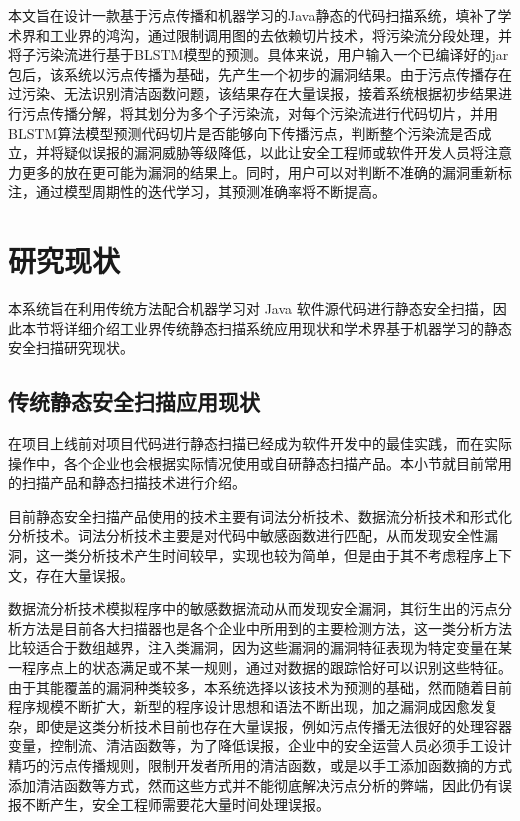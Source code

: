 本文旨在设计一款基于污点传播和机器学习的Java静态的代码扫描系统，填补了学术界和工业界的鸿沟，通过限制调用图的去依赖切片技术，将污染流分段处理，并将子污染流进行基于BLSTM模型的预测。具体来说，用户输入一个已编译好的jar包后，该系统以污点传播为基础，先产生一个初步的漏洞结果。由于污点传播存在过污染、无法识别清洁函数问题，该结果存在大量误报，接着系统根据初步结果进行污点传播分解，将其划分为多个子污染流，对每个污染流进行代码切片，并用BLSTM算法模型预测代码切片是否能够向下传播污点，判断整个污染流是否成立，并将疑似误报的漏洞威胁等级降低，以此让安全工程师或软件开发人员将注意力更多的放在更可能为漏洞的结果上。同时，用户可以对判断不准确的漏洞重新标注，通过模型周期性的迭代学习，其预测准确率将不断提高。

\section{研究现状}
本系统旨在利用传统方法配合机器学习对 Java 软件源代码进行静态安全扫描，因此本节将详细介绍工业界传统静态扫描系统应用现状和学术界基于机器学习的静态安全扫描研究现状。\\

\subsection{传统静态安全扫描应用现状}

在项目上线前对项目代码进行静态扫描已经成为软件开发中的最佳实践，而在实际操作中，各个企业也会根据实际情况使用或自研静态扫描产品。本小节就目前常用的扫描产品和静态扫描技术进行介绍。

目前静态安全扫描产品使用的技术主要有词法分析技术、数据流分析技术和形式化分析技术。词法分析技术主要是对代码中敏感函数进行匹配，从而发现安全性漏洞，这一类分析技术产生时间较早，实现也较为简单，但是由于其不考虑程序上下文，存在大量误报。

数据流分析技术模拟程序中的敏感数据流动从而发现安全漏洞，其衍生出的污点分析方法是目前各大扫描器也是各个企业中所用到的主要检测方法，这一类分析方法比较适合于数组越界，注入类漏洞，因为这些漏洞的漏洞特征表现为特定变量在某一程序点上的状态满足或不某一规则，通过对数据的跟踪恰好可以识别这些特征。由于其能覆盖的漏洞种类较多，本系统选择以该技术为预测的基础，然而随着目前程序规模不断扩大，新型的程序设计思想和语法不断出现，加之漏洞成因愈发复杂，即使是这类分析技术目前也存在大量误报，例如污点传播无法很好的处理容器变量，控制流、清洁函数等，为了降低误报，企业中的安全运营人员必须手工设计精巧的污点传播规则，限制开发者所用的清洁函数，或是以手工添加函数摘的方式添加清洁函数等方式，然而这些方式并不能彻底解决污点分析的弊端，因此仍有误报不断产生，安全工程师需要花大量时间处理误报。

